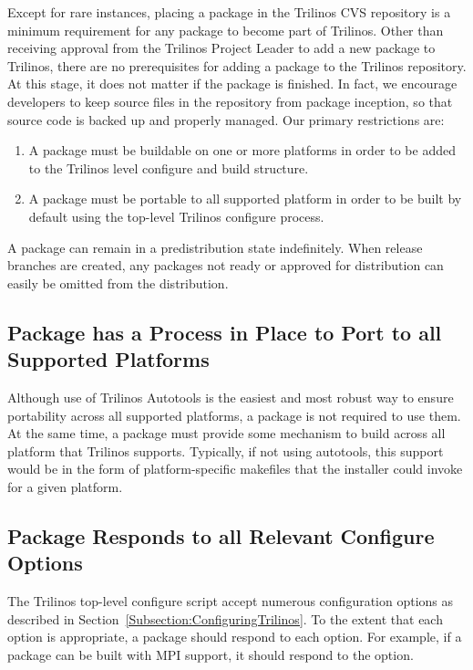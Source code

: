 \documentclass[12pt,relax]{TrilinosDevGuide}
\begin{document}
Except for rare instances, placing a package in the Trilinos CVS
repository is a minimum requirement for any package to become part of 
Trilinos.  Other than receiving approval from the Trilinos Project Leader to 
add a new package to Trilinos, there are no prerequisites for adding a  
package to the Trilinos repository.  At this stage, it does not matter if the 
package is finished.  In fact, we encourage
developers to keep source files in the repository from package
inception, so that source code is backed up and properly managed.
Our primary restrictions are:
\begin{enumerate}
\item A package must be buildable on one or more platforms in order to
be added to the Trilinos level configure and build 
structure.  
\item A package must be portable to all supported platform in order to
be built by default using the top-level Trilinos configure process.
\end{enumerate}
A package can remain in a predistribution state indefinitely.  
When release branches are created, any packages not ready or approved for 
distribution can easily be omitted from the distribution.

\subsection{Package has a Process in Place to Port to all Supported Platforms}
Although use of Trilinos Autotools is the easiest and most robust way
to ensure portability across all supported platforms, a package is not
required to use them.  At the same time, a package must provide some
mechanism to build across all platform that Trilinos supports.
Typically, if not using autotools, this support would be in the form
of platform-specific makefiles that the installer could invoke for a
given platform.

\subsection{Package Responds to all Relevant Configure Options}

The Trilinos top-level configure script accept numerous configuration
options as described in Section~\ref{Subsection:ConfiguringTrilinos}.
To the extent that each option is appropriate, a package should
respond to each option.  For example, if a package can be built with
MPI support, it should respond to the  option.
\end{document}
